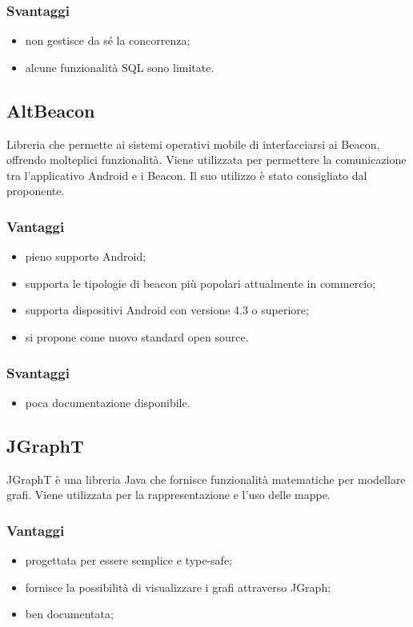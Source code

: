\documentclass[../SpecificaTecnica.tex]{subfiles}
\begin{document}
		\subsubsection{Svantaggi}
		\begin{itemize}
			\item non gestisce da sé la concorrenza;
			\item alcune funzionalità SQL sono limitate.
		\end{itemize}
		
	\subsection{AltBeacon}
		Libreria che permette ai sistemi operativi mobile di interfacciarsi ai Beacon, offrendo molteplici funzionalità. Viene utilizzata per permettere la comunicazione tra l'applicativo Android e i Beacon. Il suo utilizzo è stato consigliato dal proponente.
		\subsubsection{Vantaggi}
			\begin{itemize}
				\item pieno supporto Android;
				\item supporta le tipologie di beacon più popolari attualmente in commercio;
				\item supporta dispositivi Android con versione 4.3 o superiore;
				\item si propone come nuovo standard open source.
			\end{itemize}
		\subsubsection{Svantaggi}
			\begin{itemize}
				\item poca documentazione disponibile.
			\end{itemize}
			
	\subsection{JGraphT}
		JGraphT è una libreria Java che fornisce funzionalità matematiche per modellare grafi. Viene utilizzata per la rappresentazione e l'uso delle mappe.

		\subsubsection{Vantaggi}
			\begin{itemize}
				\item progettata per essere semplice e type-safe;
				\item fornisce la possibilità di visualizzare i grafi attraverso JGraph;
				\item ben documentata;
			\end{itemize}							
			
\end{document}

